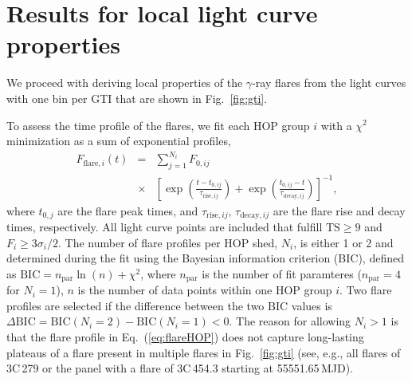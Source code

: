 \documentclass[twocolumn]{aastex62}
\newcommand{\gray}{$\gamma$-ray\xspace}
\begin{document}
\section{Results for local light curve properties}
\label{sec:results-local}

We proceed with deriving local properties of the \gray flares from the light curves with one bin per GTI that are shown in Fig.~\ref{fig:gti}.

To assess the time profile of the flares,
we fit each HOP group $i$ with a $\chi^2$ minimization as a sum of exponential profiles, 
\begin{eqnarray}
    F_{\mathrm{flare},i}(t) &=& 
    \sum\limits_{j = 1}^{N_i} F_{0,ij}\nonumber\\
    &\times&\left[\exp\left(\frac{t - t_{0,ij}}{\tau_{\mathrm{rise},ij}}\right) + \exp
    \left(\frac{t_{0,ij} - t}{\tau_{\mathrm{decay},ij}}\right)\right]^{-1}\!\!\!,
    \label{eq:flareHOP}
\end{eqnarray}
where $t_{0,j}$ are the flare peak times, and $\tau_{\mathrm{rise},ij}$, $\tau_{\mathrm{decay},ij}$ are the flare rise and decay times, respectively.
All light curve points are included that fulfill $\mathrm{TS}\geqslant9$ and $F_i \geqslant 3\sigma_i/2 $.
The number of flare profiles per HOP shed, $N_i$, is either 1 or 2 and determined during the fit using the Bayesian information criterion (BIC), defined as $\mathrm{BIC} = n_\mathrm{par}\ln(n) + \chi^2$, where $n_\mathrm{par}$ is the number of fit paramteres ($n_\mathrm{par} = 4$ for $N_i = 1$), $n$ is the number of data points within one HOP group $i$. Two flare profiles are selected if the difference between the two BIC values is $\Delta\mathrm{BIC} = \mathrm{BIC}(N_i = 2) - \mathrm{BIC}(N_i = 1) < 0$.
The reason for allowing $N_i > 1$ is that the flare profile in Eq.~(\ref{eq:flareHOP}) does not capture long-lasting plateaus of a flare present in multiple flares in Fig.~\ref{fig:gti} (see, e.g., all flares of 3C\,279 or the panel with a flare of 3C\,454.3 starting at 55551.65\,MJD).
\end{document}

